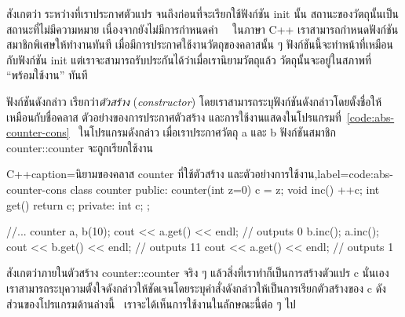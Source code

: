 สังเกต{\wbr}ว่า ระหว่าง{\wbr}ที่{\wbr}เรา{\wbr}ประกาศ{\wbr}ตัวแปร จนถึง{\wbr}ก่อน{\wbr}ที่{\wbr}จะ{\wbr}เรียก{\wbr}ใช้{\wbr}ฟังก์ชัน {\ct init} นั้น{\wbr}
สถานะ{\wbr}ของ{\wbr}วัตถุ{\wbr}นั้น{\wbr}เป็น{\wbr}สถานะ{\wbr}ที่{\wbr}ไม่{\wbr}มี{\wbr}ความหมาย เนื่องจาก{\wbr}ยัง{\wbr}ไม่{\wbr}มี{\wbr}การ{\wbr}กำหนด{\wbr}ค่า \ \ ใน{\wbr}ภาษา{\wbr}
C++ เรา{\wbr}สามารถ{\wbr}กำหนด{\wbr}ฟังก์ชัน{\wbr}สมาชิกพิเศษ{\wbr}ให้{\wbr}ทำงาน{\wbr}ทันที{\wbr}
เมื่อ{\wbr}มี{\wbr}การ{\wbr}ประกาศใช้{\wbr}งาน{\wbr}วัตถุ{\wbr}ของ{\wbr}ค{\wbr}ลา{\wbr}ส{\wbr}นั้น ๆ  ฟังก์ชัน{\wbr}นี้{\wbr}จะ{\wbr}ทำ{\wbr}หน้าที่{\wbr}เหมือน{\wbr}กับ{\wbr}ฟังก์ชัน {\ct init}  แต่{\wbr}เรา{\wbr}จะ{\wbr}สามารถ{\wbr}รับประกัน{\wbr}ได้{\wbr}ว่า{\wbr}เมื่อ{\wbr}เรา{\wbr}นิยาม{\wbr}วัตถุ{\wbr}แล้ว วัตถุ{\wbr}นั้น{\wbr}จะ{\wbr}อยู่{\wbr}ใน{\wbr}สภาพ{\wbr}ที่ ``พร้อม{\wbr}ใช้{\wbr}งาน'' ทันที{\wbr}

ฟังก์ชัน{\wbr}ดังกล่าว เรียก{\wbr}ว่า{\em ตัว{\wbr}สร้าง} ({\em constructor})
โดย{\wbr}เรา{\wbr}สามารถ{\wbr}ระบุ{\wbr}ฟังก์ชัน{\wbr}ดังกล่าว{\wbr}โดย{\wbr}ตั้ง{\wbr}ชื่อ{\wbr}ให้{\wbr}เหมือน{\wbr}กับ{\wbr}ชื่อ{\wbr}ค{\wbr}ลา{\wbr}ส
ตัวอย่าง{\wbr}ของ{\wbr}การ{\wbr}ประกาศ{\wbr}ตัว{\wbr}สร้าง{\wbr}
และ{\wbr}การ{\wbr}ใช้{\wbr}งาน{\wbr}แสดง{\wbr}ใน{\wbr}โปรแกรม{\wbr}ที่~\ref{code:abs-counter-cons} \ ใน{\wbr}โปรแกรม{\wbr}ดังกล่าว{\wbr}
เมื่อ{\wbr}เรา{\wbr}ประกาศ{\wbr}วัตถุ {\ct a} และ {\ct b} ฟังก์ชัน{\wbr}สมาชิก {\ct counter::counter}
จะ{\wbr}ถูก{\wbr}เรียก{\wbr}ใช้{\wbr}งาน{\wbr}

\latintext
\begin{codelist}{C++}{caption={\thaitext นิยาม{\wbr}ของ{\wbr}ค{\wbr}ลา{\wbr}ส {\ct counter} ที่{\wbr}ใช้{\wbr}ตัว{\wbr}สร้าง และ{\wbr}ตัวอย่าง{\wbr}การ{\wbr}ใช้{\wbr}งาน\latintext},label=code:abs-counter-cons}
class counter {
public:
  counter(int z=0) { c = z; }
  void inc() { ++c; }
  int get() { return c; }
private:
  int c;
};

  //...
  counter a, b(10);
  cout << a.get() << endl;    // outputs 0
  b.inc(); a.inc();
  cout << b.get() << endl;    // outputs 11
  cout << a.get() << endl;    // outputs 1
\end{codelist}
\thaitext

สังเกต{\wbr}ว่า{\wbr}ภายใน{\wbr}ตัว{\wbr}สร้าง {\ct counter::counter} จริง ๆ
แล้ว{\wbr}สิ่ง{\wbr}ที่{\wbr}เรา{\wbr}ทำ{\wbr}ก็{\wbr}เป็น{\wbr}การ{\wbr}สร้าง{\wbr}ตัวแปร {\ct c} นั่นเอง{\wbr}
เรา{\wbr}สามารถ{\wbr}ระบุ{\wbr}ความ{\wbr}ตั้งใจ{\wbr}ดังกล่าว{\wbr}ให้{\wbr}ชัดเจน{\wbr}โดย{\wbr}ระบุ{\wbr}คำสั่ง{\wbr}ดังกล่าว{\wbr}ให้{\wbr}เป็น{\wbr}การ{\wbr}เรียก{\wbr}ตัว{\wbr}สร้าง{\wbr}ของ{\wbr}
{\ct c} ดัง{\wbr}ส่วน{\wbr}ของ{\wbr}โปรแกรม{\wbr}ด้าน{\wbr}ล่าง{\wbr}นี้ \ เรา{\wbr}จะ{\wbr}ได้{\wbr}เห็น{\wbr}การ{\wbr}ใช้{\wbr}งาน{\wbr}ใน{\wbr}ลักษณะ{\wbr}นี้{\wbr}ต่อ ๆ ไป{\wbr}

